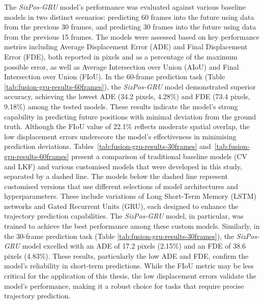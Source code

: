 \documentclass[12pt,oneside]{book} %
\begin{document}
The \textit{SizPos-GRU} model’s performance was evaluated against various
baseline models in two distinct scenarios: predicting 60 frames into the future
using data from the previous 30 frames, and predicting 30 frames into the
future using data from the previous 15 frames. The models were assessed based
on key performance metrics including Average Displacement Error (ADE) and Final
Displacement Error (FDE), both reported in pixels and as a percentage of the
maximum possible error, as well as Average Intersection over Union (AIoU) and
Final Intersection over Union (FIoU). In the 60-frame prediction task (Table
\ref{tab:fusion-gru-results-60frames}), the \textit{SizPos-GRU} model
demonstrated superior accuracy, achieving the lowest ADE (34.2 pixels, 4.28\%)
and FDE (73.4 pixels, 9.18\%) among the tested models. These results indicate
the model’s strong capability in predicting future positions with minimal
deviation from the ground truth. Although the FIoU value of 22.1\% reflects
moderate spatial overlap, the low displacement errors underscore the model’s
effectiveness in minimising prediction deviations.
Tables~\ref{tab:fusion-gru-results-30frames}
and~\ref{tab:fusion-gru-results-60frames} present a comparison of traditional
baseline models (CV and LKF) and various customised models that were developed
in this study, separated by a dashed line. The models below the dashed line
represent customised versions that use different selections of model
architectures and hyperparameters. These include variations of Long Short-Term
Memory (LSTM) networks and Gated Recurrent Units (GRU), each designed to
enhance the trajectory prediction capabilities. The \textit{SizPos-GRU} model,
in particular, was trained to achieve the best performance among these custom
models. Similarly, in the 30-frame prediction task (Table
\ref{tab:fusion-gru-results-30frames}), the \textit{SizPos-GRU} model excelled
with an ADE of 17.2 pixels (2.15\%) and an FDE of 38.6 pixels (4.83\%). These
results, particularly the low ADE and FDE, confirm the model’s reliability in
short-term predictions. While the FIoU metric may be less critical for the
application of this thesis, the low displacement errors validate the model’s
performance, making it a robust choice for tasks that require precise
trajectory prediction. 
\end{document}
